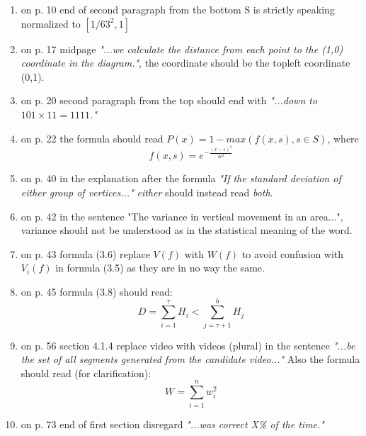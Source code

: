\documentclass[12pt]{report}
\begin{document}
%
\noindent
\begin{enumerate}
%
\item on p. 10 end of second paragraph from the bottom S is strictly speaking normalized to $[1/63^2,1]$
%
\item on p. 17 midpage \textit{"...we calculate the distance from each point to the (1,0) coordinate in the diagram."}, the coordinate should be the topleft coordinate (0,1).
%
\item on p. 20 second paragraph from the top should end with \textit{"...down to $101 \times 11 = 1111$."}
%
\item on p. 22 the formula should read $P(x) = 1 - max(f(x,s), s \in S)$, where 
\[
f(x,s)=e^{-\frac{(x-s)^{2}}{2c^{2}}}
\]
%
\item on p. 40 in the explanation after the formula \textit{"If the standard deviation of either group of vertices..."} \textit{either} should instead read \textit{both}.
%
\item on p. 42 in the sentence "The variance in vertical movement in an area...", variance should not be understood as in the statistical meaning of the word.
%
\item on p. 43 formula (3.6) replace $V(f)$ with $W(f)$ to avoid confusion with $V_i(f)$ in formula (3.5) as they are in no way the same.
%
\item on p. 45 formula (3.8) should read:
\[
D=\sum_{i=1}^{\tau}H_i < \sum_{j=\tau+1}^{b}H_j
\]
%
\item on p. 56 section 4.1.4 replace video with videos (plural) in the sentence \textit{"...be the set of all segments generated from the candidate video..."}
Also the formula should read (for clarification):
\[
W = \sum_{i=1}^n w_i^2
\]
%
\item on p. 73 end of first section disregard \textit{"...was correct X\% of the time."}
%
\end{enumerate}
%
\end{document}
